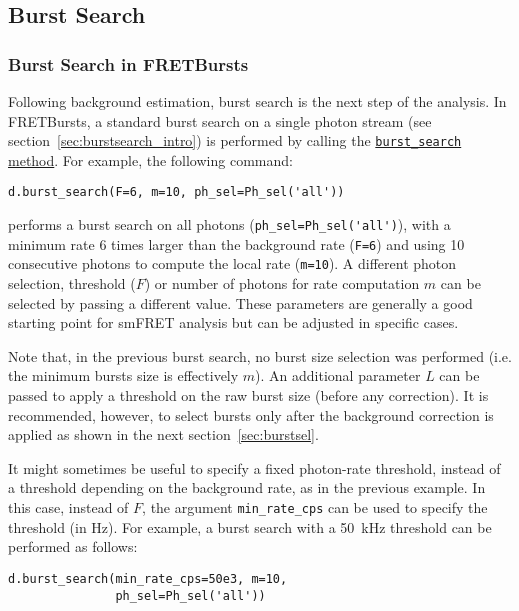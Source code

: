 \subsection{Burst Search}
\label{sec:burstsearch}

\subsubsection{Burst Search in FRETBursts}
\label{sec:burstsearch_code}

Following background estimation, burst search is the next step of
the analysis.
In FRETBursts, a standard burst search on a single photon stream
(see section~\ref{sec:burstsearch_intro}) is performed by calling the
\href{http://fretbursts.readthedocs.org/en/latest/data\_class.html#fretbursts.burstlib.Data.burst\_search}{\texttt{burst\_search} method}.
For example, the following command:

\begin{lstlisting}
d.burst_search(F=6, m=10, ph_sel=Ph_sel('all'))
\end{lstlisting}

performs a burst search on all photons
(\verb|ph_sel=Ph_sel('all')|), with a minimum rate 6 times larger than the
background rate (\verb|F=6|) and using 10 consecutive photons to compute the
local rate (\verb|m=10|).
A different photon selection, threshold ($F$) or number of photons for rate
computation $m$ can be selected by passing a different value. These parameters
are generally a good starting point for smFRET analysis but can be adjusted in
specific cases.

Note that, in the previous burst search, no burst size selection was performed
(i.e. the minimum bursts size is effectively $m$).
An additional parameter $L$ can be passed to apply a threshold on the raw burst
size (before any correction).
It is recommended, however, to select bursts only after the background correction
is applied as shown in the next section~\ref{sec:burstsel}.

It might sometimes be useful to specify a fixed photon-rate threshold, instead
of a threshold depending on the background rate, as in the previous example. In
this case, instead of $F$, the argument \verb|min_rate_cps| can be used to
specify the threshold (in Hz). For example, a burst search with a 50~kHz
threshold can be performed as follows:

\begin{lstlisting}
d.burst_search(min_rate_cps=50e3, m=10, 
               ph_sel=Ph_sel('all'))
\end{lstlisting}

